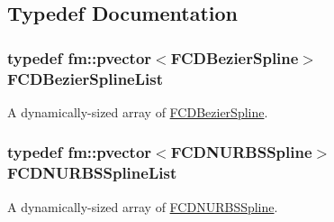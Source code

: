 \subsection{Typedef Documentation}
\hypertarget{group__FCDGeometry_ga682b3a25e3a6897d53ed4ecfca38cc02}{
\subsubsection[{FCDBezierSplineList}]{\setlength{\rightskip}{0pt plus 5cm}typedef {\bf fm::pvector}$<${\bf FCDBezierSpline}$>$ {\bf FCDBezierSplineList}}}
\label{group__FCDGeometry_ga682b3a25e3a6897d53ed4ecfca38cc02}
A dynamically-\/sized array of \hyperlink{classFCDBezierSpline}{FCDBezierSpline}. \hypertarget{group__FCDGeometry_ga3a3cbf3258acc2e38013b0393f0fedc8}{
\subsubsection[{FCDNURBSSplineList}]{\setlength{\rightskip}{0pt plus 5cm}typedef {\bf fm::pvector}$<${\bf FCDNURBSSpline}$>$ {\bf FCDNURBSSplineList}}}
\label{group__FCDGeometry_ga3a3cbf3258acc2e38013b0393f0fedc8}
A dynamically-\/sized array of \hyperlink{classFCDNURBSSpline}{FCDNURBSSpline}. 
